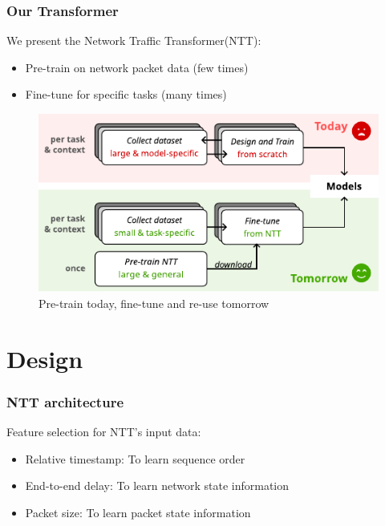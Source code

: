 \documentclass{beamer}
\begin{document}
\begin{frame}
\frametitle{Our Transformer}

We present the Network Traffic Transformer(NTT):
\pause

 \begin{itemize}  
    \item<1-> Pre-train on network packet data (few times)
    \item<1-> Fine-tune for specific tasks (many times)
\end{itemize}
\pause

\begin{figure}[!hbt]
  \begin{center}
    \includegraphics[scale=0.8]{figures/vision.pdf}
    \caption{Pre-train today, fine-tune and re-use tomorrow}
    \label{fig:vision}
  \end{center}
\end{figure}
    
    
\end{frame}


\section{Design}


\begin{frame}
\frametitle{NTT architecture}

Feature selection for NTT's input data:
\pause 
\begin{itemize}
    \item<1-> \alert{Relative timestamp:} To learn sequence order
    \item<1-> \alert{End-to-end delay:} To learn network state information
    \item<1-> \alert{Packet size:} To learn packet state information
\end{itemize}

\end{frame}
\end{document}
